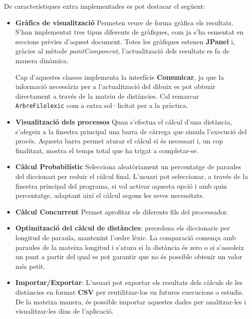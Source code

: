 \documentclass{ieeetj}
\begin{document}
De característiques extra implementades es pot destacar el següent:
\begin{itemize}
    \item \textbf{Gràfics de visualització} Permeten veure de forma gràfica els resultats.
     S'han implementat tres tipus diferents de gràfiques, com ja s'ha esmentat en seccions prèvies d'aquest document. Totes les gràfiques estenen \textbf{JPanel} i, gràcies al mètode \textit{paintComponent}, l'actualització dels resultats es fa de manera dinàmica. \newline

    Cap d'aquestes classes implementa la interfície \textbf{Comunicar}, ja que la informació necessària per a l'actualització del dibuix es pot obtenir directament a través de la matriu de distàncies. Cal remarcar \texttt{ArbreFilolexic} com a extra sol·licitat per a la pràctica.
    \item \textbf{Visualització dels processos} Quan s'efectua el càlcul d'una distància, s'afegeix a la finestra principal una barra de càrrega que simula l'execució del procés. Aquesta barra permet aturar el càlcul si és necessari i, un cop finalitzat, mostra el temps total que ha trigat a completar-se.\newline
    
    \item \textbf{Càlcul Probabilístic} Selecciona aleatòriament un percentatge de paraules del diccionari per reduir el càlcul final.
    L'usuari pot seleccionar, a través de la finestra principal del programa, si vol activar aquesta opció i amb quin percentatge, adaptant així el càlcul segons les seves necessitats.\newline
    
    \item \textbf{Càlcul Concurrent} Permet aprofitar els diferents fils del processador.\newline
    
  \item \textbf{Optimització del càlcul de distàncies}: preordena els diccionaris per longitud de paraula, mantenint l’ordre lèxic. La comparació comença amb paraules de la mateixa longitud i s’atura si la distància és zero o si s’assoleix un punt a partir del qual es pot garantir que no és possible obtenir un valor més petit.
    
    \item \textbf{Importar/Exportar}: L'usuari pot exportar els resultats dels càlculs de les distàncies en format \textbf{CSV} per reutilitzar-los en futures execucions o estudis. De la mateixa manera, és possible importar aquestes dades per analitzar-les i visualitzar-les dins de l'aplicació.
    
\end{itemize}
\end{document}
